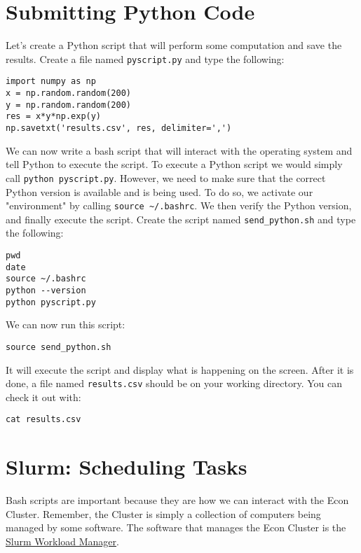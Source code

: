\documentclass[12pt, a4paper]{article}
\begin{document}
\section{Submitting Python Code}
\label{sec:org410159b}
Let's create a Python script that will perform some computation and save the results.
Create a file named \texttt{pyscript.py} and type the following:
\lstset{language=jupyter-python,label= ,caption= ,captionpos=b,numbers=none}
\begin{lstlisting}
import numpy as np
x = np.random.random(200)
y = np.random.random(200)
res = x*y*np.exp(y)
np.savetxt('results.csv', res, delimiter=',')
\end{lstlisting}

We can now write a bash script that will interact with the operating system and tell Python to execute the script.
To execute a Python script we would simply call \texttt{python pyscript.py}.
However, we need to make sure that the correct Python version is available and is being used.
To do so, we activate our "environment" by calling \texttt{source \textasciitilde{}/.bashrc}.
We then verify the Python version, and finally execute the script.
Create the script named \texttt{send\_python.sh} and type the following:
\lstset{language=bash,label= ,caption= ,captionpos=b,firstnumber=1,numbers=left,style=bash}
\begin{lstlisting}
pwd
date
source ~/.bashrc
python --version
python pyscript.py
\end{lstlisting}

We can now run this script:
\lstset{language=bash,label= ,caption= ,captionpos=b,firstnumber=1,numbers=left,style=bash}
\begin{lstlisting}
source send_python.sh
\end{lstlisting}
It will execute the script and display what is happening on the screen.
After it is done, a file named \texttt{results.csv} should be on your working directory.
You can check it out with:
\lstset{language=bash,label= ,caption= ,captionpos=b,firstnumber=1,numbers=left,style=bash}
\begin{lstlisting}
cat results.csv
\end{lstlisting}
\section{Slurm: Scheduling Tasks}
\label{sec:orgf22cc05}
Bash scripts are important because they are how we can interact with the Econ Cluster.
Remember, the Cluster is simply a collection of computers being managed by some software.
The software that manages the Econ Cluster is the \href{https://en.wikipedia.org/wiki/Slurm\_Workload\_Manager}{Slurm Workload Manager}.
\end{document}
